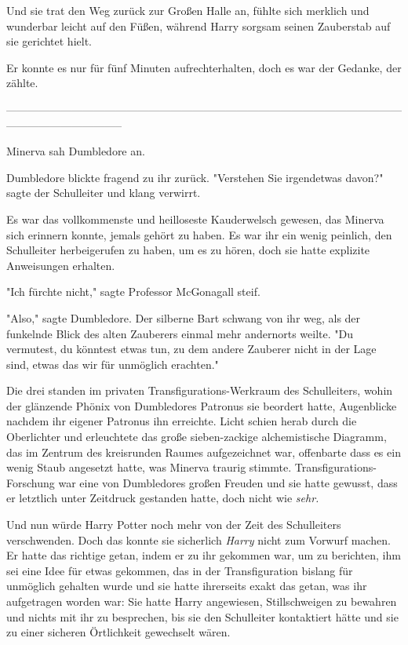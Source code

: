 {Und sie trat den Weg zurück zur Großen Halle an, fühlte sich merklich und wunderbar leicht auf den Füßen, während Harry sorgsam seinen Zauberstab auf sie gerichtet hielt.

Er konnte es nur für fünf Minuten aufrechterhalten, doch es war der Gedanke, der zählte.

--------------------------------------------------------------------------------------------------------------------------------------------

Minerva sah Dumbledore an.

Dumbledore blickte fragend zu ihr zurück. "Verstehen Sie irgendetwas davon?" sagte der Schulleiter und klang verwirrt.

Es war das vollkommenste und heilloseste Kauderwelsch gewesen, das Minerva sich erinnern konnte, jemals gehört zu haben. Es war ihr ein wenig peinlich, den Schulleiter herbeigerufen zu haben, um es zu hören, doch sie hatte explizite Anweisungen erhalten.

"Ich fürchte nicht," sagte Professor McGonagall steif.

"Also," sagte Dumbledore. Der silberne Bart schwang von ihr weg, als der funkelnde Blick des alten Zauberers einmal mehr andernorts weilte. "Du vermutest, du könntest etwas tun, zu dem andere Zauberer nicht in der Lage sind, etwas das wir für unmöglich erachten."

Die drei standen im privaten Transfigurations-Werkraum des Schulleiters, wohin der glänzende Phönix von Dumbledores Patronus sie beordert hatte, Augenblicke nachdem ihr eigener Patronus ihn erreichte. Licht schien herab durch die Oberlichter und erleuchtete das große sieben-zackige alchemistische Diagramm, das im Zentrum des kreisrunden Raumes aufgezeichnet war, offenbarte dass es ein wenig Staub angesetzt hatte, was Minerva traurig stimmte. Transfigurations-Forschung war eine von Dumbledores großen Freuden und sie hatte gewusst, dass er letztlich unter Zeitdruck gestanden hatte, doch nicht wie \emph{sehr.}

Und nun würde Harry Potter noch mehr von der Zeit des Schulleiters verschwenden. Doch das konnte sie sicherlich \emph{Harry} nicht zum Vorwurf machen. Er hatte das richtige getan, indem er zu ihr gekommen war, um zu berichten, ihm sei eine Idee für etwas gekommen, das in der Transfiguration bislang für unmöglich gehalten wurde und sie hatte ihrerseits exakt das getan, was ihr aufgetragen worden war: Sie hatte Harry angewiesen, Stillschweigen zu bewahren und nichts mit ihr zu besprechen, bis sie den Schulleiter kontaktiert hätte und sie zu einer sicheren Örtlichkeit gewechselt wären.

}
